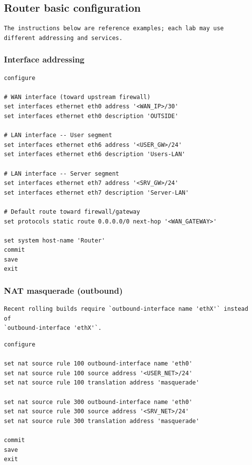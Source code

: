 \subsection{Router basic configuration}

\begin{lstlisting}
The instructions below are reference examples; each lab may use different addressing and services.
\end{lstlisting}

\subsubsection{Interface addressing}

\begin{lstlisting}
configure

# WAN interface (toward upstream firewall)
set interfaces ethernet eth0 address '<WAN_IP>/30'
set interfaces ethernet eth0 description 'OUTSIDE'

# LAN interface -- User segment
set interfaces ethernet eth6 address '<USER_GW>/24'
set interfaces ethernet eth6 description 'Users-LAN'

# LAN interface -- Server segment
set interfaces ethernet eth7 address '<SRV_GW>/24'
set interfaces ethernet eth7 description 'Server-LAN'

# Default route toward firewall/gateway
set protocols static route 0.0.0.0/0 next-hop '<WAN_GATEWAY>'

set system host-name 'Router'
commit
save
exit
\end{lstlisting}

\subsubsection{NAT masquerade (outbound)}

\begin{lstlisting}
Recent rolling builds require `outbound-interface name 'ethX'` instead of
`outbound-interface 'ethX'`.
\end{lstlisting}

\begin{lstlisting}
configure

set nat source rule 100 outbound-interface name 'eth0'
set nat source rule 100 source address '<USER_NET>/24'
set nat source rule 100 translation address 'masquerade'

set nat source rule 300 outbound-interface name 'eth0'
set nat source rule 300 source address '<SRV_NET>/24'
set nat source rule 300 translation address 'masquerade'

commit
save
exit
\end{lstlisting}

